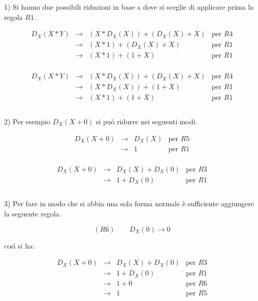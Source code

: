 \documentclass{article}
\begin{document}
1) Si hanno due possibili riduzioni in base a dove si sceglie di applicare prima la regola $R1$.

\[\begin{array}{llll}
D_X(X * Y) & \to & (X * D_X(X)) + (D_X(X) + X) & \mbox{per $R4$} \\
                 & \to & (X * 1) + (D_X(X) + X) & \mbox{per $R1$} \\
                 & \to & (X * 1) + (1 + X) & \mbox{per $R1$} \\
\end{array}\]

\[\begin{array}{llll}
D_X(X * Y) & \to & (X * D_X(X)) + (D_X(X) + X) & \mbox{per $R4$} \\
                 & \to & (X * D_X(X)) + (1 + X) & \mbox{per $R1$} \\
                 & \to & (X * 1) + (1 + X) & \mbox{per $R1$} \\
\end{array}\]

\paragraph{}

2) Per esempio $D_X(X + 0)$ si può ridurre nei seguenti modi.

\[\begin{array}{llll}
D_X(X + 0) & \to & D_X(X) & \mbox{per $R5$} \\
           & \to & 1 & \mbox{per $R1$} \\
\end{array}\]

\[\begin{array}{llll}
D_X(X + 0) & \to & D_X(X) + D_X(0) & \mbox{per $R3$} \\
           & \to & 1 + D_X(0)& \mbox{per $R1$} \\
\end{array}\]

\paragraph{}

3) Per fare in modo che si abbia una sola forma normale è sufficiente aggiungere la seguente regola.

        \[(R6) \qquad D_X(0) \to 0\] 

così si ha:

\[\begin{array}{llll}
D_X(X + 0) & \to & D_X(X) + D_X(0) & \mbox{per $R3$} \\
           & \to & 1 + D_X(0)& \mbox{per $R1$} \\
           & \to & 1 + 0 & \mbox{per $R6$} \\
           & \to & 1 & \mbox{per $R5$} \\
\end{array}\]
\end{document}
